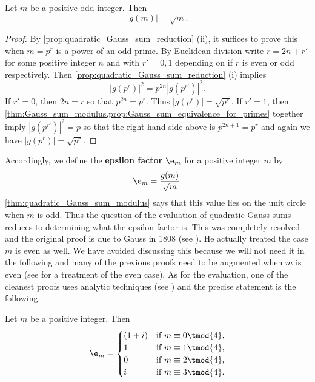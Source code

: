         \begin{theorem}\label{thm:quadratic_Gauss_sum_modulus}
          Let $m$ be a positive odd integer. Then
          \[
            |g(m)| = \sqrt{m}.
          \]
        \end{theorem}
        \begin{proof}
          By \cref{prop:quadratic_Gauss_sum_reduction} (ii), it suffices to prove this when $m = p^{r}$ is a power of an odd prime. By Euclidean division write $r = 2n+r'$ for some positive integer $n$ and with $r' = 0,1$ depending on if $r$ is even or odd respectively. Then \cref{prop:quadratic_Gauss_sum_reduction} (i) implies
          \[
            |g(p^{r})|^{2} = p^{2n}|g(p^{r'})|^{2}.
          \]
          If $r' = 0$, then $2n = r$ so that $p^{2n} = p^{r}$. Thus $|g(p^{r})| = \sqrt{p^{r}}$. If $r' = 1$, then \cref{thm:Gauss_sum_modulus,prop:Gauss_sum_equivalence_for_primes} together imply $|g(p^{r'})|^{2} = p$ so that the right-hand side above is $p^{2n+1} = p^{r}$ and again we have $|g(p^{r})| = \sqrt{p^{r}}$.
        \end{proof}

        Accordingly, we define the \textbf{epsilon factor} $\e_{m}$ for a positive integer $m$ by
        \[
          \e_{m} = \frac{g(m)}{\sqrt{m}}.
        \]
        \cref{thm:quadratic_Gauss_sum_modulus} says that this value lies on the unit circle when $m$ is odd. Thus the question of the evaluation of quadratic Gauss sums reduces to determining what the epsilon factor is. This was completely resolved and the original proof is due to Gauss in 1808 (see \cite{Gauss1808summatio}). He actually treated the case $m$ is even as well. We have avoided discussing this because we will not need it in the following and many of the previous proofs need to be augmented when $m$ is even (see \cite{lang1994algebraic} for a treatment of the even case). As for the evaluation, one of the cleanest proofs uses analytic techniques (see \cite{lang1994algebraic}) and the precise statement is the following:

        \begin{theorem}\label{thm:Gauss's_evaluation}
          Let $m$ be a positive integer. Then
          \[
            \e_{m} = \begin{cases} (1+i) & \text{if $m \equiv 0 \tmod{4}$}, \\ 1 & \text{if $m \equiv 1 \tmod{4}$}, \\ 0 & \text{if $m \equiv 2 \tmod{4}$}, \\ i & \text{if $m \equiv 3 \tmod{4}$}. \end{cases}
          \]
        \end{theorem}

